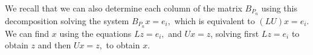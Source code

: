\documentclass[12pt]{article}
\newtheorem{proposition}[theorem]{Proposition}
\newtheorem{example}{Example}
\begin{document}
We recall that we can also determine each column of the matrix $B_{P_n}$ using this decomposition solving the system $B_{P_n}x= e_i,$ which is equivalent to $(LU)x=e_i.$ We can find $x$ using the equations $Lz= e_i,$ and $Ux=z$, solving first $Lz=e_i$ to obtain $z$ and then $ Ux=z,$ to obtain $x$. 
\end{document}
